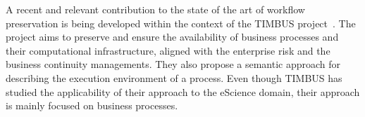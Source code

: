 A recent and relevant contribution to the state of the art of workflow preservation is being developed within the context of the TIMBUS project~\cite{timbus}. The project  aims to preserve and ensure the availability of business processes and their computational infrastructure, aligned with the enterprise risk and the business continuity managements. They also propose a semantic approach for describing the execution environment of a process.  Even though TIMBUS has studied the applicability of their approach to the eScience domain, their approach is mainly focused on business processes.
